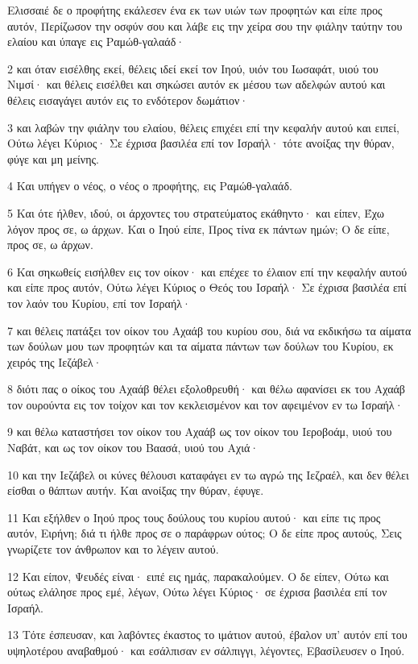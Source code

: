 \par Ελισσαιέ δε ο προφήτης εκάλεσεν ένα εκ των υιών των προφητών και είπε προς αυτόν, Περίζωσον την οσφύν σου και λάβε εις την χείρα σου την φιάλην ταύτην του ελαίου και ύπαγε εις Ραμώθ-γαλαάδ·
\par 2 και όταν εισέλθης εκεί, θέλεις ιδεί εκεί τον Ιηού, υιόν του Ιωσαφάτ, υιού του Νιμσί· και θέλεις εισέλθει και σηκώσει αυτόν εκ μέσου των αδελφών αυτού και θέλεις εισαγάγει αυτόν εις το ενδότερον δωμάτιον·
\par 3 και λαβών την φιάλην του ελαίου, θέλεις επιχέει επί την κεφαλήν αυτού και ειπεί, Ούτω λέγει Κύριος· Σε έχρισα βασιλέα επί τον Ισραήλ· τότε ανοίξας την θύραν, φύγε και μη μείνης.
\par 4 Και υπήγεν ο νέος, ο νέος ο προφήτης, εις Ραμώθ-γαλαάδ.
\par 5 Και ότε ήλθεν, ιδού, οι άρχοντες του στρατεύματος εκάθηντο· και είπεν, Έχω λόγον προς σε, ω άρχων. Και ο Ιηού είπε, Προς τίνα εκ πάντων ημών; Ο δε είπε, προς σε, ω άρχων.
\par 6 Και σηκωθείς εισήλθεν εις τον οίκον· και επέχεε το έλαιον επί την κεφαλήν αυτού και είπε προς αυτόν, Ούτω λέγει Κύριος ο Θεός του Ισραήλ· Σε έχρισα βασιλέα επί τον λαόν του Κυρίου, επί τον Ισραήλ·
\par 7 και θέλεις πατάξει τον οίκον του Αχαάβ του κυρίου σου, διά να εκδικήσω τα αίματα των δούλων μου των προφητών και τα αίματα πάντων των δούλων του Κυρίου, εκ χειρός της Ιεζάβελ·
\par 8 διότι πας ο οίκος του Αχαάβ θέλει εξολοθρευθή· και θέλω αφανίσει εκ του Αχαάβ τον ουρούντα εις τον τοίχον και τον κεκλεισμένον και τον αφειμένον εν τω Ισραήλ·
\par 9 και θέλω καταστήσει τον οίκον του Αχαάβ ως τον οίκον του Ιεροβοάμ, υιού του Ναβάτ, και ως τον οίκον του Βαασά, υιού του Αχιά·
\par 10 και την Ιεζάβελ οι κύνες θέλουσι καταφάγει εν τω αγρώ της Ιεζραέλ, και δεν θέλει είσθαι ο θάπτων αυτήν. Και ανοίξας την θύραν, έφυγε.
\par 11 Και εξήλθεν ο Ιηού προς τους δούλους του κυρίου αυτού· και είπε τις προς αυτόν, Ειρήνη; διά τι ήλθε προς σε ο παράφρων ούτος; Ο δε είπε προς αυτούς, Σεις γνωρίζετε τον άνθρωπον και το λέγειν αυτού.
\par 12 Και είπον, Ψευδές είναι· ειπέ εις ημάς, παρακαλούμεν. Ο δε είπεν, Ούτω και ούτως ελάλησε προς εμέ, λέγων, Ούτω λέγει Κύριος· σε έχρισα βασιλέα επί τον Ισραήλ.
\par 13 Τότε έσπευσαν, και λαβόντες έκαστος το ιμάτιον αυτού, έβαλον υπ' αυτόν επί του υψηλοτέρου αναβαθμού· και εσάλπισαν εν σάλπιγγι, λέγοντες, Εβασίλευσεν ο Ιηού.
